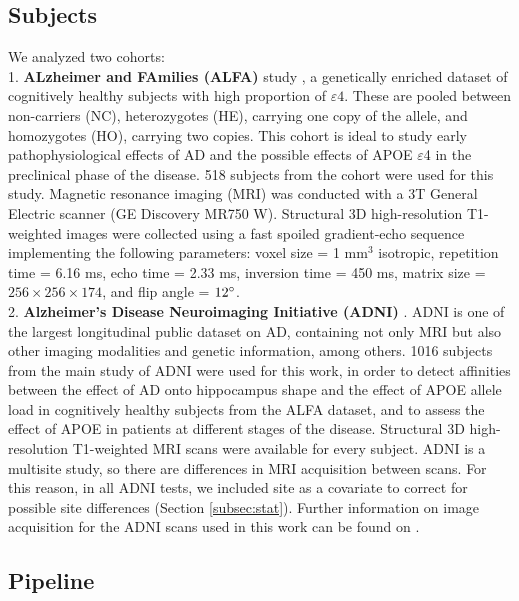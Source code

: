\subsection{Subjects}

We analyzed two cohorts: \\

1. \textbf{ALzheimer and FAmilies (ALFA)} study \cite{Molinuevo2016}, a genetically enriched dataset of cognitively healthy subjects with high proportion of $\varepsilon4$. These are pooled between non-carriers (NC), heterozygotes (HE), carrying one copy of the allele, and homozygotes (HO), carrying two copies. This cohort is ideal to study early pathophysiological effects of AD and the possible effects of APOE $\varepsilon$4 in the preclinical phase of the disease. 518 subjects from the cohort were used for this study. Magnetic resonance imaging (MRI) was conducted with a 3T General Electric scanner (GE Discovery MR750 W). Structural 3D high-resolution T1-weighted images were collected using a fast spoiled gradient-echo sequence implementing the following parameters: voxel size = 1 mm$^3$ isotropic, repetition time = 6.16 ms, echo time = 2.33 ms, inversion time = 450 ms, matrix size = $256 \times 256 \times 174$, and flip angle = $12\degree$. \\

2. \textbf{Alzheimer's Disease Neuroimaging Initiative (ADNI)} \cite{Mueller2005}. ADNI is one of the largest longitudinal public dataset on AD, containing not only MRI but also other imaging modalities and genetic information, among others. 1016 subjects from the main study of ADNI were used for this work, in order to detect affinities between the effect of AD onto hippocampus shape and the effect of APOE allele load in cognitively healthy subjects from the ALFA dataset, and to assess the effect of APOE in patients at different stages of the disease. Structural 3D high-resolution T1-weighted MRI scans were available for every subject. ADNI is a multisite study, so there are differences in MRI acquisition between scans. For this reason, in all ADNI tests, we included site as a covariate to correct for possible site differences (Section \ref{subsec:stat}). Further information on image acquisition for the ADNI scans used in this work can be found on \cite{Jack2010a}. \\

\subsection{Pipeline}
\label{sec:pipeline}

